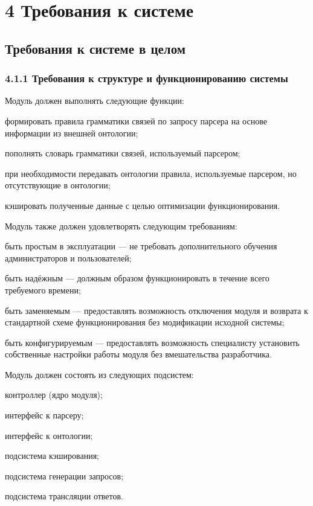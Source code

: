 \section*{4 Требования к системе}
\subsection*{Требования к системе в целом}
\subsubsection*{4.1.1 Требования к структуре и функционированию системы}

Модуль должен выполнять следующие функции:
\begin{list}{}{\leftmargin=1.5cm}
  \item формировать правила грамматики связей по запросу парсера на основе информации из внешней онтологии;
  \item пополнять словарь грамматики связей, используемый парсером;
  \item при необходимости передавать онтологии правила, используемые парсером, но отсутствующие в онтологии;
  \item кэшировать полученные данные с целью оптимизации функционирования.
\end{list}

Модуль также должен удовлетворять следующим требованиям:
\begin{list}{}{\leftmargin=1.5cm}
  \item быть простым в эксплуатации --- не требовать дополнительного обучения администраторов и пользователей;
  \item быть надёжным --- должным образом функционировать в течение всего требуемого времени;
  \item быть заменяемым --- предоставлять возможность отключения модуля и возврата к стандартной схеме функционирования без модификации исходной системы;
  \item быть конфигурируемым --- предоставлять возможность специалисту установить собственные настройки работы модуля без вмешательства разработчика.
\end{list}

Модуль должен состоять из следующих подсистем:
\begin{list}{}{\leftmargin=1.5cm}
  \item контроллер (ядро модуля);
  \item интерфейс к парсеру;
  \item интерфейс к онтологии;
  \item подсистема кэширования;
  \item подсистема генерации запросов;
  \item подсистема трансляции ответов.
\end{list}


